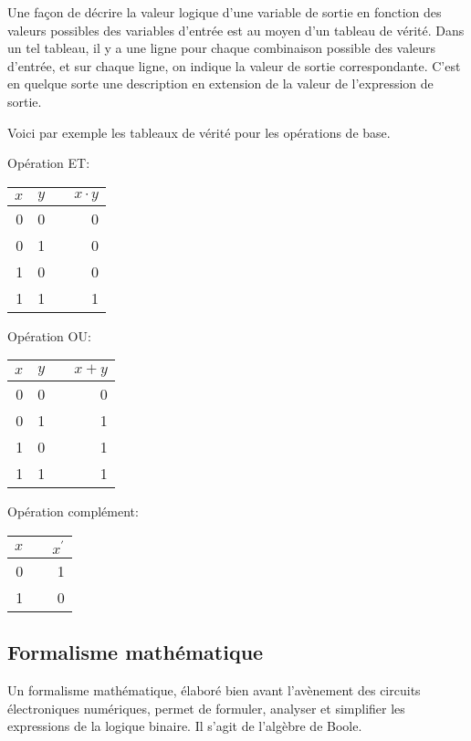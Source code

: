 \documentclass[11pt]{article}
\begin{document}
Une façon de décrire la valeur logique d'une variable de sortie en
fonction des valeurs possibles des variables d'entrée est au moyen
d'un tableau de vérité. Dans un tel tableau, il y a une ligne pour
chaque combinaison possible des valeurs d'entrée, et sur chaque ligne,
on indique la valeur de sortie correspondante. C'est en quelque sorte
une description en extension de la valeur de l'expression de sortie.

Voici par exemple les tableaux de vérité pour les opérations de base.

Opération ET:

\begin{center}
\begin{tabular}{rrlr}
\(x\) & \(y\) &  & \(x \cdot y\)\\
\hline
0 & 0 &  & 0\\
0 & 1 &  & 0\\
1 & 0 &  & 0\\
1 & 1 &  & 1\\
\end{tabular}
\end{center}

Opération OU:

\begin{center}
\begin{tabular}{rrlr}
\(x\) & \(y\) &  & \(x + y\)\\
\hline
0 & 0 &  & 0\\
0 & 1 &  & 1\\
1 & 0 &  & 1\\
1 & 1 &  & 1\\
\end{tabular}
\end{center}

Opération complément:

\begin{center}
\begin{tabular}{rlr}
\(x\) &  & \(x^{\prime}\)\\
\hline
0 &  & 1\\
1 &  & 0\\
\end{tabular}
\end{center}

\subsection{Formalisme mathématique}
\label{sec:orgb355a7b}

Un formalisme mathématique, élaboré bien avant l'avènement des
circuits électroniques numériques, permet de formuler, analyser et
simplifier les expressions de la logique binaire. Il s'agit de
l'algèbre de Boole. 
\end{document}
